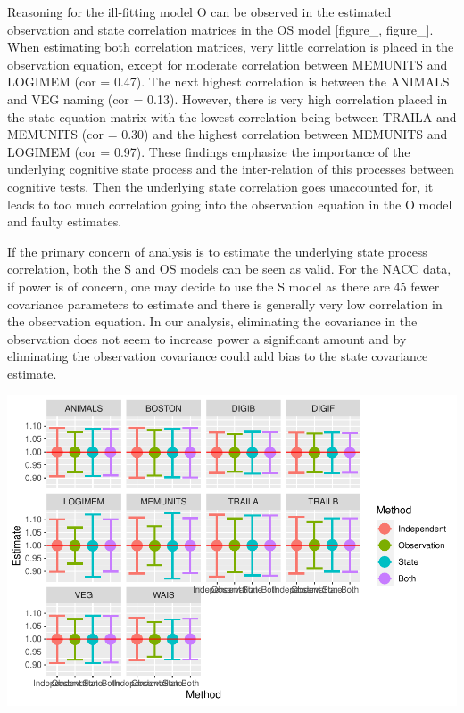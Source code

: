 \documentclass[
]{article}
\begin{document}
Reasoning for the ill-fitting model O can be observed in the estimated observation and state correlation matrices in the OS model {[}figure\_, figure\_{]}. When estimating both correlation matrices, very little correlation is placed in the observation equation, except for moderate correlation between MEMUNITS and LOGIMEM (cor = 0.47). The next highest correlation is between the ANIMALS and VEG naming (cor = 0.13). However, there is very high correlation placed in the state equation matrix with the lowest correlation being between TRAILA and MEMUNITS (cor = 0.30) and the highest correlation between MEMUNITS and LOGIMEM (cor = 0.97). These findings emphasize the importance of the underlying cognitive state process and the inter-relation of this processes between cognitive tests. Then the underlying state correlation goes unaccounted for, it leads to too much correlation going into the observation equation in the O model and faulty estimates.

If the primary concern of analysis is to estimate the underlying state process correlation, both the S and OS models can be seen as valid. For the NACC data, if power is of concern, one may decide to use the S model as there are 45 fewer covariance parameters to estimate and there is generally very low correlation in the observation equation. In our analysis, eliminating the covariance in the observation does not seem to increase power a significant amount and by eliminating the observation covariance could add bias to the state covariance estimate.

\includegraphics{RealDataSim_files/figure-latex/unnamed-chunk-2-1.pdf}
\end{document}
